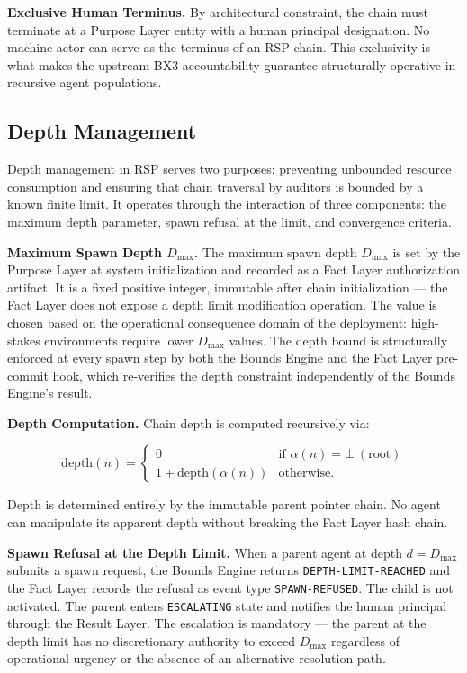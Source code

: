 \bigskip
\noindent\textbf{Exclusive Human Terminus.} By architectural constraint, the chain must terminate at a Purpose Layer entity with a human principal designation. No machine actor can serve as the terminus of an RSP chain. This exclusivity is what makes the upstream BX3 accountability guarantee structurally operative in recursive agent populations.

\subsection{Depth Management}

Depth management in RSP serves two purposes: preventing unbounded resource consumption and ensuring that chain traversal by auditors is bounded by a known finite limit. It operates through the interaction of three components: the maximum depth parameter, spawn refusal at the limit, and convergence criteria.

\bigskip
\noindent\textbf{Maximum Spawn Depth $D_{\max}$.} The maximum spawn depth $D_{\max}$ is set by the Purpose Layer at system initialization and recorded as a Fact Layer authorization artifact. It is a fixed positive integer, immutable after chain initialization — the Fact Layer does not expose a depth limit modification operation. The value is chosen based on the operational consequence domain of the deployment: high-stakes environments require lower $D_{\max}$ values. The depth bound is structurally enforced at every spawn step by both the Bounds Engine and the Fact Layer pre-commit hook, which re-verifies the depth constraint independently of the Bounds Engine's result.

\bigskip
\noindent\textbf{Depth Computation.} Chain depth is computed recursively via:

\begin{equation}
\mathrm{depth}(n) =
\begin{cases}
0 & \text{if }\alpha(n) = \bot\ (\text{root}) \\[4pt]
1 + \mathrm{depth}(\alpha(n)) & \text{otherwise}.
\end{cases}
\label{eq:rs-depth-computation}
\end{equation}

Depth is determined entirely by the immutable parent pointer chain. No agent can manipulate its apparent depth without breaking the Fact Layer hash chain.

\bigskip
\noindent\textbf{Spawn Refusal at the Depth Limit.} When a parent agent at depth $d = D_{\max}$ submits a spawn request, the Bounds Engine returns \texttt{DEPTH-LIMIT-REACHED} and the Fact Layer records the refusal as event type \texttt{SPAWN-REFUSED}. The child is not activated. The parent enters \texttt{ESCALATING} state and notifies the human principal through the Result Layer. The escalation is mandatory — the parent at the depth limit has no discretionary authority to exceed $D_{\max}$ regardless of operational urgency or the absence of an alternative resolution path.

